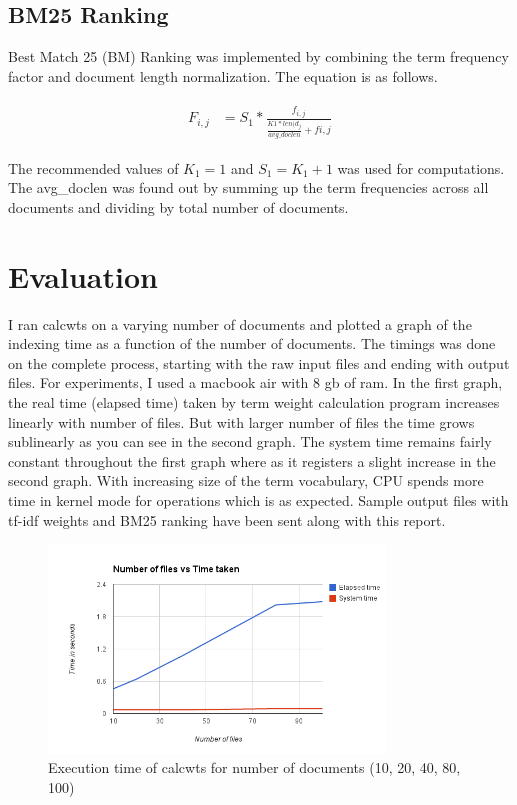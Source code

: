 \documentclass[paper=a4, fontsize=11pt]{scrartcl}
\numberwithin{equation}{section}		%
\numberwithin{figure}{section}			%
\numberwithin{table}{section}				%
\begin{document}
\subsection{BM25 Ranking}

Best Match 25 (BM) Ranking was implemented by combining the term frequency factor and document length normalization. The equation is as follows.

\begin{align} 
	\begin{split}
	F_{i, j} 	&= S_{1} * \frac{f_{i,j}}{\frac{K1 * len(d_{j}}{avg\_doclen} + f{i,j}}
	\end{split}					
\end{align} 

The recommended values of $K_{1} = 1$ and $S_{1} = K_{1} + 1$ was used for computations. The avg\_doclen was found out by summing up the term frequencies across all documents and dividing by total number of documents.

\section{Evaluation}

I ran calcwts on a varying number of documents and plotted a graph of the indexing time as a function of the number of documents. The timings was done on the complete process, starting with the raw input files and ending with output files. For experiments, I used a macbook air with 8 gb of ram. In the first graph, the real time (elapsed time) taken by term weight calculation program increases linearly with number of files. But with larger number of files the time grows sublinearly as you can see in the second graph. The system time remains fairly constant throughout the first graph where as it registers a slight increase in the second graph. With increasing size of the term vocabulary, CPU spends more time in kernel mode for operations which is as expected. Sample output files with tf-idf weights and BM25 ranking have been sent along with this report. 

\begin{figure}[h] %
  \begin{center}
    \includegraphics[width=0.8\textwidth]{20chart.png}
  \end{center}
  \caption{Execution time of calcwts for number of documents (10, 20, 40, 80, 100)}
\end{figure}
\end{document}
